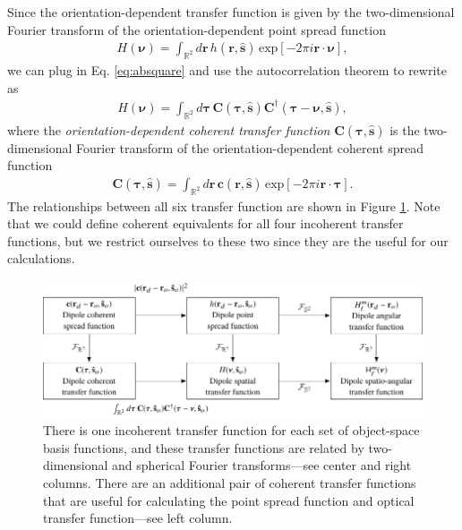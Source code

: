 \documentclass[]{osa-article}
\providecommand{\mb}[1]{\mathbf{#1}}
\providecommand{\mh}[1]{\mathbf{\hat{#1}}}
\providecommand{\mbb}[1]{\mathbb{#1}}
\providecommand{\bs}[1]{\boldsymbol{#1}}
\begin{document}
Since the orientation-dependent transfer function is given by the
two-dimensional Fourier transform of the orientation-dependent point spread
function
\begin{align}
  H(\bs{\nu}) = \int_{\mbb{R}^2}d\mb{r}\,h(\mb{r}, \mh{s})\,\text{exp}[-2\pi i\mb{r}\cdot\bs{\nu}],
\end{align}
we can plug in Eq. \ref{eq:absquare} and use the autocorrelation theorem to
rewrite as
\begin{align}
  H(\bs{\nu}) = \int_{\mbb{R}^2}d\bs{\tau}\,\mb{C}(\bs{\tau}, \mh{s})\mb{C}^\dagger(\bs{\tau} - \bs{\nu}, \mh{s}), 
\end{align}
where the \textit{orientation-dependent coherent transfer function}
$\mb{C}(\bs{\tau}, \mh{s})$ is the two-dimensional Fourier transform of the
orientation-dependent coherent spread function
\begin{align}
  \mb{C}(\bs{\tau}, \mh{s}) = \int_{\mbb{R}^2}d\mb{r}\, \mb{c}(\mb{r}, \mh{s})\,\text{exp}[-2\pi i\mb{r}\cdot\bs{\tau}].
\end{align}
The relationships between all six transfer function are shown in Figure
\ref{fig:transfer-functions}. Note that we could define coherent equivalents for
all four incoherent transfer functions, but we restrict ourselves to these two
since they are the useful for our calculations.

\begin{figure}
  \hspace{-2em}
  \includegraphics[scale=1.0]{../figures/transfer-functions/transfer-functions.pdf}
  \caption{There is one incoherent transfer function for each set of
    object-space basis functions, and these transfer functions are related by
    two-dimensional and spherical Fourier transforms---see center and right
    columns. There are an additional pair of coherent transfer functions that
    are useful for calculating the point spread function and optical transfer
    function---see left column.}
   \label{fig:transfer-functions}
 \end{figure}
    
\end{document}
